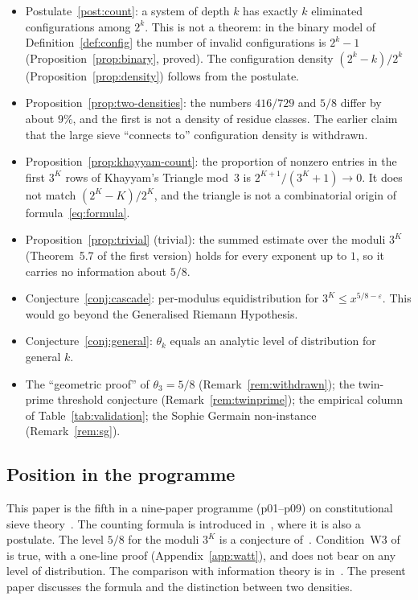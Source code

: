 \documentclass[12pt]{amsart}
\theoremstyle{plain}
\theoremstyle{definition}
\theoremstyle{remark}
\newcommand{\thetak}{\theta_k}
\begin{document}
\begin{itemize}
  \item[\textbf{[Postulate]}] Postulate~\ref{post:count}: a system of depth $k$
    has exactly $k$ eliminated configurations among $2^k$. This is not a
    theorem: in the binary model of Definition~\ref{def:config} the number of
    invalid configurations is $2^k - 1$ (Proposition~\ref{prop:binary}, proved).
    The configuration density $(2^k - k)/2^k$
    (Proposition~\ref{prop:density}) follows from the postulate.
  \item[\textbf{[Proved]}] Proposition~\ref{prop:two-densities}: the numbers
    $416/729$ and $5/8$ differ by about $9\%$, and the first is not a density of
    residue classes. The earlier claim that the large sieve ``connects to''
    configuration density is withdrawn.
  \item[\textbf{[Proved]}] Proposition~\ref{prop:khayyam-count}: the
    proportion of nonzero entries in the first $3^K$ rows of Khayyam's Triangle
    mod~$3$ is $2^{K+1}/(3^K+1) \to 0$. It does not match $(2^K - K)/2^K$, and the
    triangle is not a combinatorial origin of formula~\eqref{eq:formula}.
  \item[\textbf{[Proved]}] Proposition~\ref{prop:trivial} (trivial): the summed
    estimate over the moduli $3^K$ (Theorem~5.7 of the first version) holds for
    every exponent up to $1$, so it carries no information about $5/8$.
  \item[\textbf{[Conjectured]}] Conjecture~\ref{conj:cascade}: per-modulus
    equidistribution for $3^K \leq x^{5/8-\varepsilon}$. This would go beyond
    the Generalised Riemann Hypothesis.
  \item[\textbf{[Conjectured]}] Conjecture~\ref{conj:general}: $\thetak$ equals
    an analytic level of distribution for general $k$.
  \item[\textbf{[Withdrawn]}] The ``geometric proof'' of $\theta_3 = 5/8$
    (Remark~\ref{rem:withdrawn}); the twin-prime threshold conjecture
    (Remark~\ref{rem:twinprime}); the empirical column of
    Table~\ref{tab:validation}; the Sophie Germain non-instance
    (Remark~\ref{rem:sg}).
\end{itemize}

\subsection{Position in the programme}

This paper is the fifth in a nine-paper programme (p01--p09) on constitutional
sieve theory~\cite{WakilCF,WakilKhayyam,WakilSC,WakilEisenstein,WakilShannon,WakilW3}.
The counting formula is introduced in~\cite{WakilCF}, where it is also a
postulate. The level $5/8$ for the moduli $3^K$ is a conjecture
of~\cite{WakilEisenstein}. Condition~W3 of~\cite{WakilW3} is true, with a
one-line proof (Appendix~\ref{app:watt}), and does not bear on any level of
distribution. The comparison with information theory is
in~\cite{WakilShannon}. The present paper discusses the formula and the
distinction between two densities.
\end{document}
